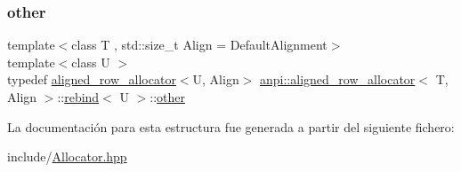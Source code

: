 \subsubsection{\texorpdfstring{other}{other}}
{\footnotesize\ttfamily template$<$class T , std\+::size\+\_\+t Align = Default\+Alignment$>$ \\
template$<$class U $>$ \\
typedef \hyperlink{classanpi_1_1aligned__row__allocator}{aligned\+\_\+row\+\_\+allocator}$<$U, Align$>$ \hyperlink{classanpi_1_1aligned__row__allocator}{anpi\+::aligned\+\_\+row\+\_\+allocator}$<$ T, Align $>$\+::\hyperlink{structanpi_1_1aligned__row__allocator_1_1rebind}{rebind}$<$ U $>$\+::\hyperlink{structanpi_1_1aligned__row__allocator_1_1rebind_a960ad1a3c52a054030a84078477bdb27}{other}}



La documentación para esta estructura fue generada a partir del siguiente fichero\+:\begin{DoxyCompactItemize}
\item 
include/\hyperlink{Allocator_8hpp}{Allocator.\+hpp}\end{DoxyCompactItemize}
